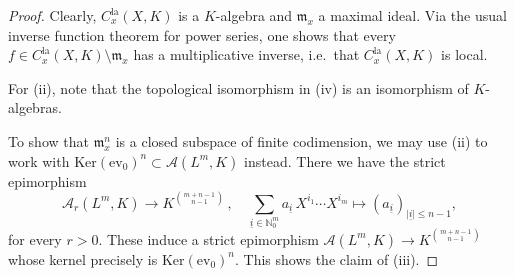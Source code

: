 \documentclass[a4paper, reqno, 10pt]{amsart}
\theoremstyle{definition}
\numberwithin{equation}{section}
\newcommand{\abs}[1]{{\lvert{#1}\rvert}}
\newcommand{\defeq}{\vcentcolon=}
\newcommand{\Ker}{{\mathrm{Ker}}}
\newcommand{\la}{{\mathrm{la}}}
\newcommand{\lra}{\longrightarrow}
\newcommand{\lto}{\longmapsto}
\newcommand{\norm}[1]{\lVert{#1}\rVert}
\newcommand{\ra}{\rightarrow}
\newcommand{\res}[1]{{\!\,\mid_{#1}}}
\newcommand{\ul}[1]{{\underline{#1}}}
\newcommand{\BN}{{\mathbb {N}}}
\newcommand{\BR}{{\mathbb {R}}}
\newcommand{\CA}{{\mathcal {A}}}
\newcommand{\Fm}{{\mathfrak {m}}}
\newcommand{\aan}{{\mathrm{rig}}}
\begin{document}
\begin{proof}
	Clearly, $C^\la_x(X,K)$ is a $K$-algebra and $\Fm_x$ a maximal ideal.
	Via the usual inverse function theorem for power series, one shows that every $f\in C^\la_x(X,K)\setminus \Fm_x$ has a multiplicative inverse, i.e.\ that $C^\la_x(X,K)$ is local.
	
	
	
	For (ii), note that the topological isomorphism in  (iv) is an isomorphism of $K$-algebras.
	
	To show that $\Fm_x^n$ is a closed subspace of finite codimension, we may use (ii) to work with $\Ker(\mathrm{ev}_0)^n \subset \CA(L^m,K)$ instead.
	There we have the strict epimorphism
	\begin{equation*}
		\CA_r(L^m,K) \lra K^{\binom{m+n-1}{n-1}} \,,\quad \sum_{\ul{i}\in \BN^m_0} a_{\ul{i}} \, X^{i_1}\cdots X^{i_m} \lto (a_{\ul{i}})_{\abs{\ul{i}} \leq n-1},
	\end{equation*}
	for every $r>0$.
	These induce a strict epimorphism $\CA (L^m,K) \ra K^{\binom{m+n-1}{n-1}}$ whose kernel precisely is $\Ker(\mathrm{ev}_0)^n$.
	This shows the claim of (iii).
\end{proof}
\end{document}

